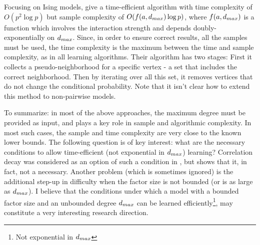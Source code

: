 Focusing on Ising models,  \cite{bresler2015efficiently} give a time-efficient algorithm with time complexity of $O(p^2\log p)$ but sample complexity of $O( f(a,d_{max}) \log p)$, where $f(a,d_{max})$ is a function which involves the interaction strength and depends doubly-exponentially on $d_{max}$.
Since, in order to ensure correct results, all the samples must be used, the time complexity is the maximum between the time and sample complexity, as in all learning algorithms. 
Their algorithm has two stages: First it collects a pseudo-neighborhood for a specific vertex - a set that includes the correct neighborhood.
Then by iterating over all this set, it removes vertices that do not change the conditional probability.
Note that it isn't clear how to extend this method to non-pairwise models.

To summarize: in most of the above approaches, the maximum degree must be provided as input, and plays a key role in sample and algorithmic complexity.
In most such cases, the sample and time complexity are very close to the known lower bounds.
The following question is of key interest: what are the necessary conditions to allow time-efficient (not exponential in $d_{max}$) learning?
Correlation decay was considered as an option of such a condition in \cite{montanari2009graphical}, but \cite{bresler2014structure} shows that it, in fact, not a necessary.
Another problem (which is sometimes ignored) is the additional step-up in difficulty when the factor size is not bounded (or is as large as $d_{max}$). 
I believe that the conditions under which a model with a bounded factor size and an unbounded degree $d_{max}$ can be learned efficiently\footnote{Not exponential in $d_{max}$}, may constitute a very interesting research direction.
